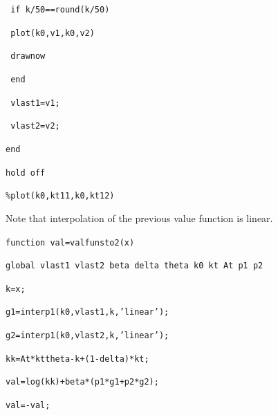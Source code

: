 \documentclass[notes=show]{beamer}
\begin{document}
\begin{frame}%

\texttt{\ \qquad if k/50==round(k/50)}

\texttt{\ \qquad \qquad plot(k0,v1,k0,v2)}

\texttt{\ \qquad \qquad drawnow}

\texttt{\ \qquad end}

\texttt{\ \qquad vlast1=v1;}

\texttt{\ \qquad vlast2=v2;}

\texttt{end}

\texttt{hold off}

\texttt{\%plot(k0,kt11,k0,kt12)}

\end{frame}%

\begin{frame}%


Note that interpolation of the previous value function is linear.

\texttt{function val=valfunsto2(x)}

\texttt{global vlast1 vlast2 beta delta theta k0 kt At p1 p2}

\texttt{k=x;}

\texttt{g1=interp1(k0,vlast1,k,'linear');}

\texttt{g2=interp1(k0,vlast2,k,'linear');}

\texttt{kk=At*kttheta-k+(1-delta)*kt;}

\texttt{val=log(kk)+beta*(p1*g1+p2*g2);}

\texttt{val=-val;}

\end{frame}%
\end{document}
